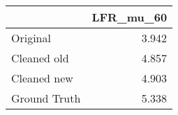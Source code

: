 \begin{tabular}{lr}
\toprule
{} & LFR_mu_60 \\
\midrule
Original     &     3.942 \\
Cleaned old  &     4.857 \\
Cleaned new  &     4.903 \\
Ground Truth &     5.338 \\
\bottomrule
\end{tabular}
